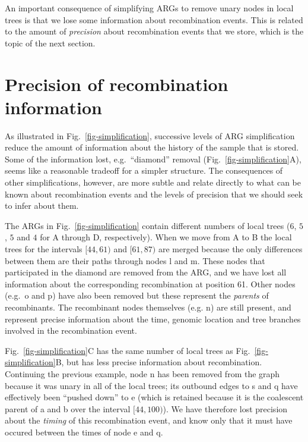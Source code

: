 \documentclass{article}
\newcommand{\noderef}[1]{\textsf{#1}}
\begin{document}
An important consequence of simplifying ARGs to remove
unary nodes in local trees is that we lose some information
about recombination
events. This is related to the amount of \emph{precision} about
recombination events that we store, which is the topic of the next
section.

\section*{Precision of recombination information}
\label{sec-precision}
As illustrated in Fig.~\ref{fig-simplification}, successive levels
of ARG simplification reduce the amount of information about the
history of the sample that is stored. Some of the information lost,
e.g.\ ``diamond'' removal (Fig.~\ref{fig-simplification}A),
seems like a reasonable tradeoff for a simpler structure.
The consequences of other simplifications, however, are
more subtle and relate directly to what can be known about
recombination events and the levels of precision that
we should seek to infer about them.

The ARGs in Fig.~\ref{fig-simplification} contain different
numbers of local trees ($6$, $5$, $5$ and $4$ for A through
D, respectively). When we move from A to B the local trees
for the intervals $[44,61)$ and $[61,87)$ are merged because
the only differences between them are their paths through
nodes \noderef{l} and \noderef{m}. These nodes that participated
in the diamond are removed from the ARG, and we have lost
all information about the corresponding recombination at
position 61. Other nodes (e.g.\ \noderef{o} and \noderef{p})
have also been removed but these represent the \emph{parents}
of recombinants. The recombinant nodes themselves
(e.g. \noderef{n}) are still present, and represent precise
information about the time, genomic location and tree
branches involved
in the recombination event.

Fig.~\ref{fig-simplification}C has the same number of local trees
as Fig.~\ref{fig-simplification}B, but has less precise information
about recombination. Continuing the previous example, node
\noderef{n} has been removed from the graph because it was unary
in all of the local trees; its outbound edges to \noderef{s}
and \noderef{q} have effectively been ``pushed down''
to \noderef{e} (which is retained because it is the coalescent
parent of \noderef{a} and \noderef{b} over the interval
$[44, 100)$). We
have therefore lost precision about
the \emph{timing} of this recombination event, and know only
that it must have occured between the times of node \noderef{e}
and \noderef{q}.
\end{document}
